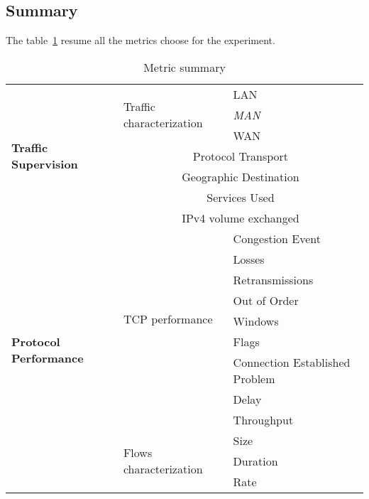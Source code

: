 \documentclass[10pt, conference, a4paper, twocolumns]{IEEEtran}
\begin{document}
\subsection{Summary}
The table~\ref{table:metrics} resume all the metrics choose for the experiment.
\begin{table}[ht!]
	\centering
	\caption{Metric summary}
	\begin{tabular}{|p{}|p{}|p{}|}
\hline
\multirow{7}{0.1\textwidth}{\textbf{Traffic Supervision}}  & \multirow{3}{0.1\textwidth}{Traffic characterization}        & LAN              \\ \cline{3-3} 
                        &                     & \textit{MAN}          \\ \cline{3-3} 
                        &                     & WAN              \\ \cline{2-3} 
                        & \multicolumn{2}{c|}{Protocol Transport}                 \\ \cline{2-3} 
                        & \multicolumn{2}{c|}{Geographic Destination}               \\ \cline{2-3} 
                        & \multicolumn{2}{c|}{Services Used}                    \\ \cline{2-3} 
                        & \multicolumn{2}{c|}{IPv4 volume exchanged}                \\ \hline
\multirow{11}{0.1\textwidth}{\textbf{Protocol Performance}} & \multirow{8}{0.1\textwidth}{TCP performance}    & Congestion Event        \\ \cline{3-3} 
                        &                     & Losses             \\ \cline{3-3} 
                        &                     & Retransmissions        \\ \cline{3-3} 
                        &                     & Out of Order        \\ \cline{3-3} 
                        &                     & Windows            \\ \cline{3-3} 
                        &                     & Flags             \\ \cline{3-3} 
                        &                     & Connection Established Problem \\ \cline{3-3} 
                        &                     & Delay             \\ \cline{3-3} 
                        &                     & Throughput           \\ \cline{2-3} 
                        & \multirow{3}{0.1\textwidth}{Flows characterization} & Size              \\ \cline{3-3} 
                        &                     & Duration            \\ \cline{3-3} 
                        &                     & Rate              \\ \hline
\end{tabular}
   \label{table:metrics}
\end{table}
\end{document}
